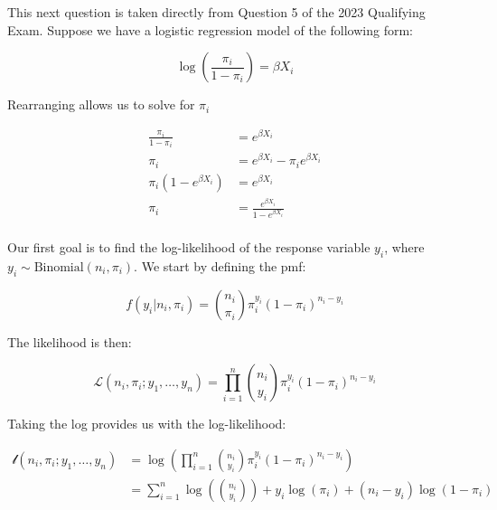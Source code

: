 \documentclass{report}
\begin{document}
This next question is taken directly from Question 5 of the 2023 Qualifying Exam. Suppose we have a logistic regression model of the following form:

\begin{equation}\label{eq:ex-glm-2023q5-binomial-model-form-1}
    \log\left(\frac{\pi_i}{1-\pi_i}\right) = \beta X_i 
\end{equation}

Rearranging allows us to solve for $\pi_i$

\begin{equation}\label{eq:ex-glm-2023q5-binomial-model-form-2}
    \begin{aligned}
        \frac{\pi_i}{1-\pi_i} &= e^{\beta X_i} \\
        \pi_i &= e^{\beta X_i} - \pi_i e^{\beta X_i} \\
        \pi_i \left(1 - e^{\beta X_i}\right) &= e^{\beta X_i} \\
        \pi_i &= \frac{e^{\beta X_i}}{1-e^{\beta X_i}} \\
    \end{aligned}
\end{equation}

Our first goal is to find the log-likelihood of the response variable $y_i$, where $y_i \sim \text{Binomial}(n_i, \pi_i)$. We start by defining the \gls{pmf}:

\begin{equation}\label{eq:ex-glm-2023q5-binomial-pmf}
    f(y_i | n_i, \pi_i) = \binom{n_i}{\pi_i} \pi_i^{y_i} (1-\pi_i)^{n_i-y_i}
\end{equation}

The likelihood is then:

\begin{equation}\label{eq:ex-glm-2023q5-binomial-likelihood}
    \mathcal{L}\left(n_i, \pi_i; y_1, \dots, y_n\right) = \prod_{i=1}^n \binom{n_i}{y_i} \pi_i^{y_i} (1-\pi_i)^{n_i-y_i}
\end{equation}

Taking the log provides us with the log-likelihood:

\begin{equation}\label{eq:ex-glm-2023q5-binomial-loglikelihood}
    \begin{aligned}
        \mathcal{l}\left(n_i, \pi_i; y_1, \dots, y_n\right) 
          &= \log\left(\prod_{i=1}^n \binom{n_i}{y_i} \pi_i^{y_i} (1-\pi_i)^{n_i-y_i}\right) \\
          &= \sum_{i=1}^n \log\left(\binom{n_i}{y_i}\right) + y_i \log(\pi_i) + (n_i-y_i)\log(1-\pi_i) \\
    \end{aligned}
\end{equation}
\end{document}
